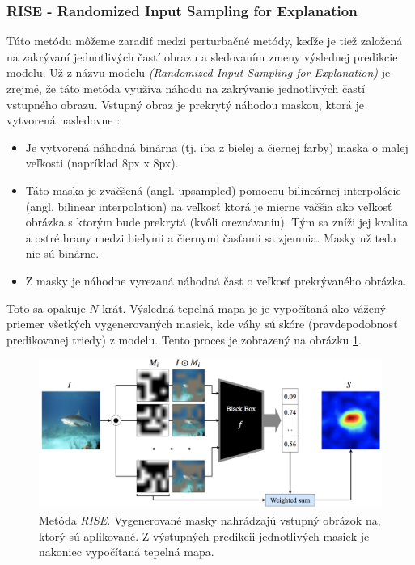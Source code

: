
\subsubsection{RISE - Randomized Input Sampling for Explanation \label{sec:rise}}

Túto metódu môžeme zaradiť medzi perturbačné metódy, keďže je tiež založená na zakrývaní jednotlivých častí obrazu a sledovaním zmeny výslednej predikcie modelu. Už z názvu modelu \textit{(Randomized Input Sampling for Explanation)} je zrejmé, že táto metóda využíva náhodu na zakrývanie jednotlivých častí vstupného obrazu. Vstupný obraz je prekrytý náhodou maskou, ktorá je vytvorená nasledovne \cite{petsiuk2018rise}:

\begin{itemize}
    \item Je vytvorená náhodná binárna (tj. iba z bielej a čiernej farby) maska o malej veľkosti (napríklad 8px x 8px).
    \item Táto maska je zväčšená (angl. upsampled) pomocou bilineárnej interpolácie \cite{petsiuk2018rise} (angl. bilinear interpolation) na veľkosť ktorá je mierne väčšia ako veľkosť obrázka s ktorým bude prekrytá (kvôli oreznávaniu). Tým sa zníži jej kvalita a ostré hrany medzi bielymi a čiernymi časťami sa zjemnia. Masky už teda nie sú binárne.
    \item Z masky je náhodne vyrezaná náhodná čast o veľkosť prekrývaného obrázka.
\end{itemize}


Toto sa opakuje $N$ krát. Výsledná tepelná mapa je je vypočítaná ako vážený priemer všetkých vygenerovaných masiek, kde váhy sú skóre (pravdepodobnosť predikovanej triedy) z modelu. Tento proces je zobrazený na obrázku \ref{fig:rise_architecture}.

\begin{figure}[h!]
    \centering
    \includegraphics[scale=0.35]{assets/images/rise_architecture.png}
    \caption{Metóda \textit{RISE}. \cite{petsiuk2018rise} Vygenerované masky nahrádzajú vstupný obrázok na, ktorý sú aplikované. Z výstupných predikcii jednotlivých masiek je nakoniec vypočítaná tepelná mapa.}
    \label{fig:rise_architecture}
\end{figure}

